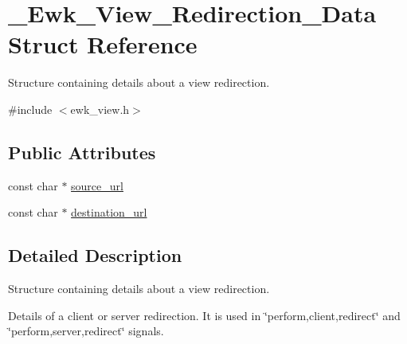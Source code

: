 \hypertarget{struct__Ewk__View__Redirection__Data}{\section{\+\_\+\+Ewk\+\_\+\+View\+\_\+\+Redirection\+\_\+\+Data Struct Reference}
\label{struct__Ewk__View__Redirection__Data}
}


Structure containing details about a view redirection.  




{\ttfamily \#include $<$ewk\+\_\+view.\+h$>$}

\subsection*{Public Attributes}
\begin{DoxyCompactItemize}
\item 
const char $\ast$ \hyperlink{struct__Ewk__View__Redirection__Data_a237691fabc93da92c8d7a3cfbf9a619a}{source\+\_\+url}
\item 
const char $\ast$ \hyperlink{struct__Ewk__View__Redirection__Data_a90bac80f79f3a7572b932a3662836663}{destination\+\_\+url}
\end{DoxyCompactItemize}


\subsection{Detailed Description}
Structure containing details about a view redirection. 

Details of a client or server redirection. It is used in \char`\"{}perform,client,redirect\char`\"{} and \char`\"{}perform,server,redirect\char`\"{} signals. 


